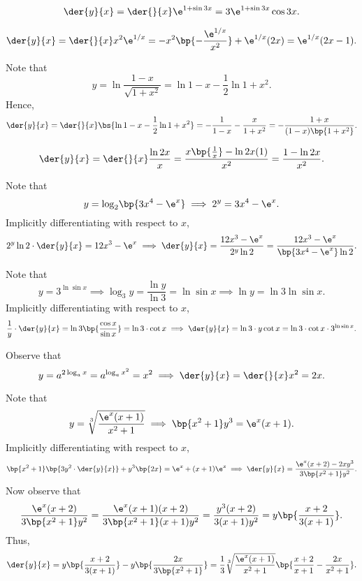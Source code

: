 \begin{solution}
    \begin{ppart}
        \[\der{y}{x} =  \der{}{x} \e^{1 + \sin 3x} = 3 \e^{1 + \sin 3x} \cos{3x}.\]
    \end{ppart}
    \begin{ppart}
        \[\der{y}{x} = \der{}{x} x^2 \e^{1/x} = -x^2 \bp{-\frac{\e^{1/x}}{x^2}} + \e^{1/x}(2x) = \e^{1/x}(2x-1).\]
    \end{ppart}
    \begin{ppart}
        Note that \[y = \ln{\frac{1-x}{\sqrt{1 + x^2}}} = \ln{1-x} - \frac12 \ln{1 + x^2}.\] Hence, \[\der{y}{x} = \der{}{x} \bs{\ln{1-x} - \frac12 \ln{1 + x^2}} = -\frac1{1-x} - \frac{x}{1 + x^2} = -\frac{1 + x}{(1-x)\bp{1 + x^2}}.\]
    \end{ppart}
    \begin{ppart}
        \[\der{y}{x} = \der{}{x} \frac{\ln{2x}}x = \frac{x \bp{\frac1x} - \ln{2x}(1)}{x^2} = \frac{1 - \ln{2x}}{x^2}.\]
    \end{ppart}
    \begin{ppart}
        Note that \[y = {\log_2} {\bp{3x^4 - \e^x}} \implies 2^y = 3x^4 - \e^x.\] Implicitly differentiating with respect to $x$, \[2^y \ln 2 \cdot \der{y}{x} = 12x^3 - \e^x \implies \der{y}{x} = \frac{12x^3 - \e^x}{2^y \ln 2} =  \frac{12x^3 - \e^x}{\bp{3x^4 - \e^x}\ln 2}.\]
    \end{ppart}
    \begin{ppart}
        Note that \[y = 3^{\ln \sin x} \implies \log_3 y = \frac{\ln y}{\ln 3} = \ln \sin x \implies \ln y = \ln 3 \ln \sin x.\] Implicitly differentiating with respect to $x$, \[\frac1y \cdot \der{y}{x} = \ln 3 \bp{\frac{\cos x}{\sin x}} = \ln 3 \cdot \cot x \implies \der{y}{x} = \ln 3 \cdot y \cot x = \ln 3 \cdot \cot{x} \cdot 3^{\ln \sin x}.\]
    \end{ppart}
    \begin{ppart}
        Observe that \[y = a^{2\log_a x} = a^{\log_a x^2} = x^2 \implies \der{y}{x} = \der{}{x} x^2 = 2x.\]
    \end{ppart}
    \begin{ppart}
        Note that \[y = \sqrt[3]{\frac{\e^x (x+1)}{x^2 +1}} \implies \bp{x^2 + 1} y^3 = \e^x (x + 1).\] Implicitly differentiating with respect to $x$, \[\bp{x^2 + 1}\bp{3y^2 \cdot \der{y}{x}} + y^3 \bp{2x} = \e^x + (x+1)\e^x \implies \der{y}{x} = \frac{\e^x (x+2) - 2xy^3}{3\bp{x^2 + 1}y^2}.\] Now observe that \[\frac{\e^x (x+2)}{3\bp{x^2 + 1}y^2} = \frac{\e^x (x+1)(x+2)}{3\bp{x^2 + 1}(x+1)y^2} = \frac{y^3 (x+2)}{3(x+1)y^2} = y\bp{\frac{x+2}{3(x+1)}}.\] Thus, \[\der{y}{x} = y\bp{\frac{x+2}{3(x+1)}} - y\bp{\frac{2x}{3\bp{x^2 + 1}}} = \frac13 \sqrt[3]{\frac{\e^x (x+1)}{x^2 +1}} \bp{\frac{x+2}{x+1} - \frac{2x}{x^2 + 1}}.\]
    \end{ppart}
\end{solution}

